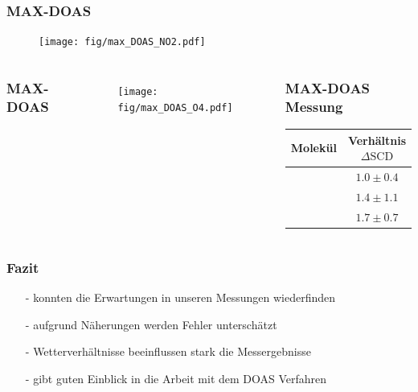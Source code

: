 \documentclass{beamer}
\begin{document}
\begin{frame}
    \frametitle{MAX-DOAS }
    \begin{figure}
    	\texttt{[image: fig/max\_DOAS\_NO2.pdf]}
    \end{figure}
\end{frame}


\begin{frame}
\begin{columns}
    \frametitle{MAX-DOAS }
    \vspace{-1cm}
    \begin{figure}
    	\texttt{[image: fig/max\_DOAS\_O4.pdf]}
    \end{figure}
	\begin{center}
		\frametitle{MAX-DOAS Messung}
		\begin{tabular*}{\linewidth}{c c}
			\toprule
			Molekül & Verhältnis $\Delta \text{SCD}$ \\
			\midrule
			\ch{O3} & $1.0 \pm 0.4$ \\
			\ch{NO2} & $1.4 \pm 1.1$ \\
			\ch{O4} & $1.7 \pm 0.7$\\
			\bottomrule
		\end{tabular*}
		\label{fig:ratio_dscd}
	\end{center}
\end{columns}
\end{frame}

\begin{frame}
	\frametitle{Fazit}
		\begin{itemize}
			\item[-] konnten die Erwartungen in unseren Messungen wiederfinden  
			 \pause
			\item[-] aufgrund Näherungen werden Fehler unterschätzt
			 \pause
			\item[-] Wetterverhältnisse beeinflussen stark die Messergebnisse
			 \pause
			\item[-] gibt guten Einblick in die Arbeit mit dem DOAS Verfahren
		\end{itemize}
\end{frame}
\end{document}
